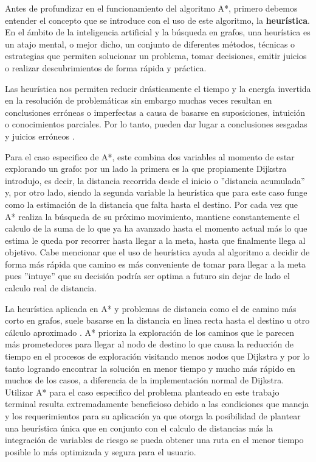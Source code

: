 \begin{itemize}
    Antes de profundizar en el funcionamiento del algoritmo A*, primero debemos entender el concepto que se introduce con el uso de este algoritmo, la \textbf{heurística}. En el ámbito de la inteligencia artificial y la búsqueda en grafos, una heurística es un atajo mental, o mejor dicho, un conjunto de diferentes métodos, técnicas o estrategias que permiten solucionar un problema, tomar decisiones, emitir juicios o realizar descubrimientos de forma rápida y práctica.

    Las heurística nos permiten reducir drásticamente el tiempo y la energía invertida en la resolución de problemáticas sin embargo muchas veces resultan en conclusiones erróneas o imperfectas a causa de basarse en suposiciones, intuición o conocimientos parciales. Por lo tanto, pueden dar lugar a conclusiones sesgadas y juicios erróneos \cite{heuristica_que}.

    Para el caso especifico de A*, este combina dos variables al momento de estar explorando un grafo: por un lado la primera es la que propiamente Dijkstra introdujo, es decir, la distancia recorrida desde el inicio o ''distancia acumulada'' y, por otro lado, siendo la segunda variable la heurística que para este caso funge como la estimación de la distancia que falta hasta el destino. Por cada vez que A* realiza la búsqueda de su próximo movimiento, mantiene constantemente el calculo de la suma de lo que ya ha avanzado hasta el momento actual más lo que estima le queda por recorrer hasta llegar a la meta, hasta que finalmente llega al objetivo. Cabe mencionar que el uso de heurística ayuda al algoritmo a decidir de forma más rápida que camino es más conveniente de tomar para llegar a la meta pues ''intuye'' que su decisión podría ser optima a futuro sin dejar de lado el calculo real de distancia. 

    La heurística aplicada en A* y problemas de distancia como el de camino más corto en grafos, suele basarse en la distancia en linea recta hasta el destino u otro cálculo aproximado \cite{dijkstra_udit}. A* prioriza la exploración de los caminos que le parecen más prometedores para llegar al nodo de destino lo que causa la reducción de tiempo en el procesos de exploración visitando menos nodos que Dijkstra y por lo tanto logrando encontrar la solución en menor tiempo y mucho más rápido en muchos de los casos, a diferencia de la implementación normal de Dijkstra. Utilizar A* para el caso especifico del problema planteado en este trabajo terminal resulta extremadamente beneficioso debido a las condiciones que maneja y los requerimientos para su aplicación ya que otorga la posibilidad de plantear una heurística única que en conjunto con el calculo de distancias más la integración de variables de riesgo se pueda obtener una ruta en el menor tiempo posible lo más optimizada y segura para el usuario.  


\end{itemize}
